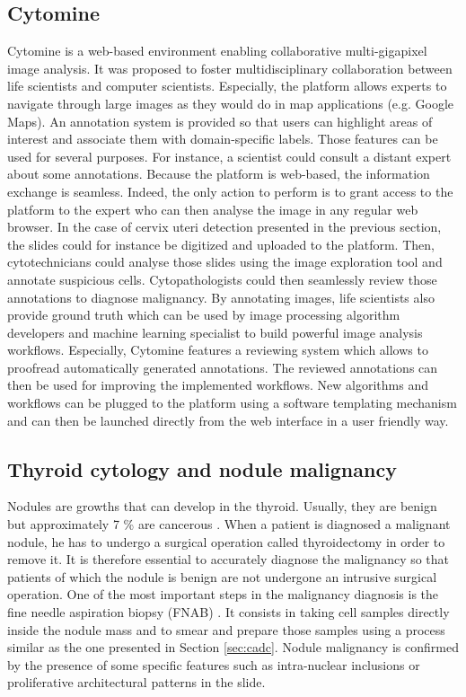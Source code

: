 \subsection{Cytomine} 
\label{sssec:detect_cytomine}
Cytomine \cite{maree2016collaborative} is a web-based environment enabling collaborative multi-gigapixel image analysis. It was proposed to foster multidisciplinary collaboration between life scientists and computer scientists. Especially, the platform allows experts to navigate through large images as they would do in map applications (e.g. Google Maps). An annotation system is provided so that users can highlight areas of interest and associate them with domain-specific labels. Those features can be used for several purposes. For instance, a scientist could consult a distant expert about some annotations. Because the platform is web-based, the information exchange is seamless. Indeed, the only action to perform is to grant access to the platform to the expert who can then analyse the image in any regular web browser. In the case of cervix uteri detection presented in the previous section, the slides could for instance be digitized and uploaded to the platform. Then, cytotechnicians could analyse those slides using the image exploration tool and annotate suspicious cells. Cytopathologists could then seamlessly review those annotations to diagnose malignancy. By annotating images, life scientists also provide ground truth which can be used by image processing algorithm developers and machine learning specialist to build powerful image analysis workflows. Especially, Cytomine features a reviewing system which allows to proofread automatically generated annotations. The reviewed annotations can then be used for improving the implemented workflows. New algorithms and workflows can be plugged to the platform using a software templating mechanism and can then be launched directly from the web interface in a user friendly way.  

\subsection{Thyroid cytology and nodule malignancy}
\label{ssec:intro_thyroid_case}
Nodules are growths that can develop in the thyroid. Usually, they are benign but approximately 7 \% are cancerous \cite{gopinath2013computer}. When a patient is diagnosed a malignant nodule, he has to undergo a surgical operation called thyroidectomy in order to remove it. It is therefore essential to accurately diagnose the malignancy so that patients of which the nodule is benign are not undergone an intrusive surgical operation. One of the most important steps in the malignancy diagnosis is the fine needle aspiration biopsy (FNAB) \cite{bomeli2010evaluation}. It consists in taking cell samples directly inside the nodule mass and to smear and prepare those samples using a process similar as the one presented in Section \ref{sec:cadc}. Nodule malignancy is confirmed by the presence of some specific features such as intra-nuclear inclusions or proliferative architectural patterns in the slide. 

